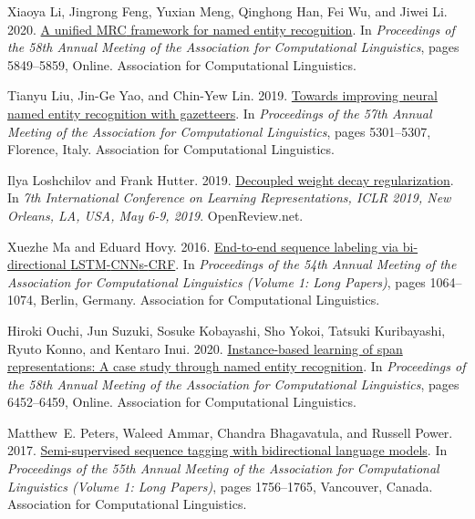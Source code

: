\documentclass[11pt]{article}
\begin{document}
\begin{thebibliography}{45}
Xiaoya Li, Jingrong Feng, Yuxian Meng, Qinghong Han, Fei Wu, and Jiwei Li.
  2020{}.
\newblock \href {https://doi.org/10.18653/v1/2020.acl-main.519} {A unified
  {MRC} framework for named entity recognition}.
\newblock In \emph{Proceedings of the 58th Annual Meeting of the Association
  for Computational Linguistics}, pages 5849--5859, Online. Association for
  Computational Linguistics.

Tianyu Liu, Jin-Ge Yao, and Chin-Yew Lin. 2019.
\newblock \href {https://doi.org/10.18653/v1/P19-1524} {Towards improving
  neural named entity recognition with gazetteers}.
\newblock In \emph{Proceedings of the 57th Annual Meeting of the Association
  for Computational Linguistics}, pages 5301--5307, Florence, Italy.
  Association for Computational Linguistics.

Ilya Loshchilov and Frank Hutter. 2019.
\newblock \href {https://openreview.net/forum?id=Bkg6RiCqY7} {Decoupled weight
  decay regularization}.
\newblock In \emph{7th International Conference on Learning Representations,
  {ICLR} 2019, New Orleans, LA, USA, May 6-9, 2019}. OpenReview.net.

Xuezhe Ma and Eduard Hovy. 2016.
\newblock \href {https://doi.org/10.18653/v1/P16-1101} {End-to-end sequence
  labeling via bi-directional {LSTM}-{CNN}s-{CRF}}.
\newblock In \emph{Proceedings of the 54th Annual Meeting of the Association
  for Computational Linguistics (Volume 1: Long Papers)}, pages 1064--1074,
  Berlin, Germany. Association for Computational Linguistics.

Hiroki Ouchi, Jun Suzuki, Sosuke Kobayashi, Sho Yokoi, Tatsuki Kuribayashi,
  Ryuto Konno, and Kentaro Inui. 2020.
\newblock \href {https://doi.org/10.18653/v1/2020.acl-main.575} {Instance-based
  learning of span representations: A case study through named entity
  recognition}.
\newblock In \emph{Proceedings of the 58th Annual Meeting of the Association
  for Computational Linguistics}, pages 6452--6459, Online. Association for
  Computational Linguistics.

Matthew~E. Peters, Waleed Ammar, Chandra Bhagavatula, and Russell Power. 2017.
\newblock \href {https://doi.org/10.18653/v1/P17-1161} {Semi-supervised
  sequence tagging with bidirectional language models}.
\newblock In \emph{Proceedings of the 55th Annual Meeting of the Association
  for Computational Linguistics (Volume 1: Long Papers)}, pages 1756--1765,
  Vancouver, Canada. Association for Computational Linguistics.


\end{thebibliography}
\end{document}
